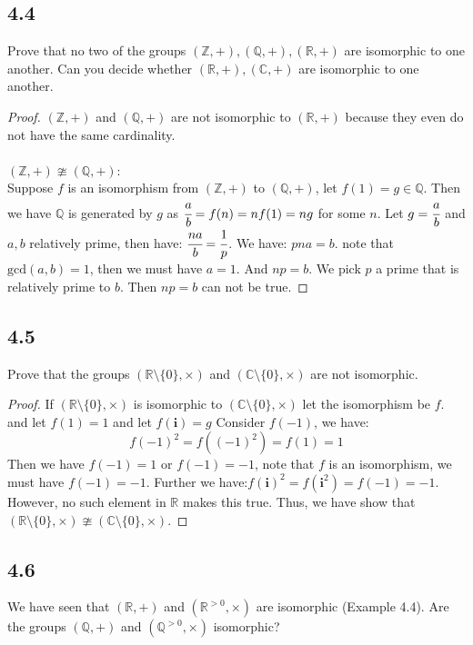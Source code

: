 \documentclass[a4paper, pdf, 12pt]{article}
\begin{document}
\subsection*{4.4}
Prove that no two of the groups $(\mathbb{Z}, +), (\mathbb{Q}, +), (\mathbb{R},+)$ are isomorphic to one
another. Can you decide whether $(\mathbb{R}, +), (\mathbb{C}, +)$ are isomorphic to one another.
\begin{proof}
  $(\mathbb{Z, +})$ and $(\mathbb{Q, +})$ are not isomorphic to $(\mathbb{R}, +)$ because they even
  do not have the same cardinality. \\
  \\
  \noindent
  $(\mathbb{Z}, +)\ncong (\mathbb{Q}, +)$: \\
  Suppose $f$ is an isomorphism from $(\mathbb{Z}, +)$ to $(\mathbb{Q}, +)$, let $f(1) = g\in \mathbb{Q}$. Then we have $\mathbb{Q}$ is generated by
  $g$ as $\cfrac{a}{b}=f(n) = nf(1)=ng$ for some $n$. Let $g = \cfrac{a}{b}$ and $a, b$ relatively prime, then have:
  $\cfrac{na}{b}=\cfrac{1}{p}$. We have: $pna=b$. note that $\mbox{gcd}(a,b)=1$, then we must have $a=1$. And $np=b$. We pick $p$ a prime that
  is relatively prime to $b$. Then $np=b$ can not be true.
\end{proof}

\subsection*{4.5}
Prove that the groups $(\mathbb{R}\setminus\{0\}, \times)$ and $(\mathbb{C}\setminus\{0\}, \times)$ are not isomorphic.

\begin{proof}
  If $(\mathbb{R}\setminus\{0\},\times)$ is isomorphic to $(\mathbb{C}\setminus\{0\},\times)$ let the isomorphism be $f$.
  and let $f(1) = 1$ and let $f(\mathbf{i})=g$ Consider $f(-1)$, we have:
  $$
    f(-1)^{2} = f((-1)^{2}) = f(1) = 1
  $$ Then we have $f(-1) = 1$ or $f(-1) = -1$, note that $f$ is an isomorphism, we must have $f(-1) = -1$.
  Further we have:$f(\mathbf{i})^{2} = f(\mathbf{i}^{2}) = f(-1) = -1$. However, no such element in $\mathbb{R}$ makes this true.
  Thus, we have show that $(\mathbb{R}\setminus\{0\},\times)\ncong (\mathbb{C}\setminus\{0\},\times)$.
\end{proof}

\subsection*{4.6}
We have seen that $(\mathbb{R}, +)$ and $(\mathbb{R}^{>0}, \times)$ are isomorphic (Example 4.4). Are the
groups $(\mathbb{Q}, +)$ and $(\mathbb{Q}^{>0}, \times)$ isomorphic?\\
\end{document}
